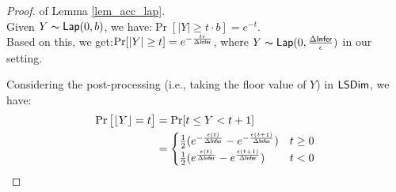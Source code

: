 \documentclass{article}
\begin{document}
\begin{proof} of Lemma \ref{lem_acc_lap}.\\
Given $Y \thicksim \mathsf{Lap}(0, b)$, we have\cite{dwork2014algorithmic}:$\Pr[|Y| \geq t \cdot b] = e^{- t}.$\\
Based on this, we get:$\Pr[|Y| \geq t] = e^{- \frac{t \epsilon}{\Delta \mathsf{Infer}}}$, where $Y \thicksim \mathsf{Lap}(0, \frac{\Delta \mathsf{Infer}}{\epsilon})$ in our setting.

Considering the post-processing (i.e., taking the floor value of $Y$) in $\mathsf{LSDim}$, we have:
\begin{align*}
\Pr\big[\lfloor Y \rfloor = t\big]&= \Pr[ t \leq Y < t + 1]\\
&= 
\begin{cases}
\frac{1}{2} (e^{- \frac{\epsilon (t)}{\Delta \mathsf{Infer}}} - e^{- \frac{\epsilon (t + 1)}{\Delta \mathsf{Infer}}}) &  t \geq 0\\
\frac{1}{2} (e^{\frac{\epsilon (t)}{\Delta \mathsf{Infer}}} - e^{\frac{\epsilon (t + 1)}{\Delta \mathsf{Infer}}}) & t < 0
\end{cases}
\end{align*}


\end{proof}
\end{document}
